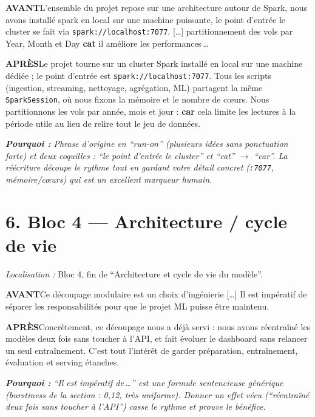 \documentclass[11pt,a4paper]{article}
\newcommand{\av}{\textbf{\textcolor{avant}{AVANT}}\quad}
\newcommand{\ap}{\textbf{\textcolor{apres}{APRÈS}}\quad}
\newcommand{\pourquoi}[1]{\par\smallskip\noindent\textit{\textbf{Pourquoi :} #1}\par\smallskip}
\begin{document}
\begin{avantbox}
\av L'ensemble du projet repose sur une architecture autour de Spark, nous avons installé
spark en local sur une machine puissante, le point d'entrée le cluster se fait via
\texttt{spark://localhost:7077}. [\dots] partitionnement des vols par Year, Month et Day
\textbf{cat} il améliore les performances\,\dots
\end{avantbox}
\begin{apresbox}
\ap Le projet tourne sur un cluster Spark installé en local sur une machine dédiée ; le
point d'entrée est \texttt{spark://localhost:7077}. Tous les scripts (ingestion, streaming,
nettoyage, agrégation, ML) partagent la même \texttt{SparkSession}, où nous fixons la
mémoire et le nombre de cœurs. Nous partitionnons les vols par année, mois et jour :
\textbf{car} cela limite les lectures à la période utile au lieu de relire tout le jeu de
données.
\end{apresbox}
\pourquoi{Phrase d'origine en \enquote{run-on} (plusieurs idées sans ponctuation forte) et
deux coquilles : \enquote{le point d'entrée le cluster} et \enquote{cat} $\rightarrow$
\enquote{car}. La réécriture découpe le rythme \emph{tout en gardant} votre détail concret
(\texttt{:7077}, mémoire/cœurs) qui est un excellent marqueur humain.}

\section*{6. Bloc 4 --- Architecture / cycle de vie}
\noindent\textit{Localisation :} Bloc 4, fin de \enquote{Architecture et cycle de vie du modèle}.

\begin{avantbox}
\av Ce découpage modulaire est un choix d'ingénierie [\dots] Il est impératif de séparer
les responsabilités pour que le projet ML puisse être maintenu.
\end{avantbox}
\begin{apresbox}
\ap Concrètement, ce découpage nous a déjà servi : nous avons réentraîné les modèles deux
fois sans toucher à l'API, et fait évoluer le dashboard sans relancer un seul
entraînement. C'est tout l'intérêt de garder préparation, entraînement, évaluation et
serving étanches.
\end{apresbox}
\pourquoi{\enquote{Il est impératif de\,\dots} est une formule sentencieuse générique
(burstiness de la section : 0,12, très uniforme). Donner un \emph{effet vécu}
(\enquote{réentraîné deux fois sans toucher à l'API}) casse le rythme et prouve le bénéfice.}
\end{document}
